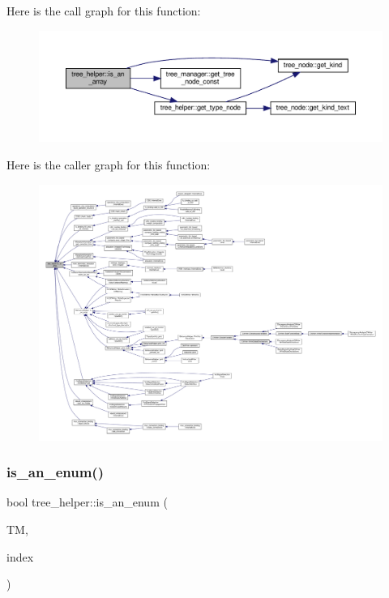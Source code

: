 Here is the call graph for this function\+:
\nopagebreak
\begin{figure}[H]
\begin{center}
\leavevmode
\includegraphics[width=350pt]{d7/d99/classtree__helper_a66c316e257537a7af62192751c0fb26a_cgraph}
\end{center}
\end{figure}
Here is the caller graph for this function\+:
\nopagebreak
\begin{figure}[H]
\begin{center}
\leavevmode
\includegraphics[width=350pt]{d7/d99/classtree__helper_a66c316e257537a7af62192751c0fb26a_icgraph}
\end{center}
\end{figure}
\mbox{\label{classtree__helper_ad18a626687479193e34f341bf2cc131e}} 
\subsubsection{\texorpdfstring{is\+\_\+an\+\_\+enum()}{is\_an\_enum()}}
{\footnotesize\ttfamily bool tree\+\_\+helper\+::is\+\_\+an\+\_\+enum (\begin{DoxyParamCaption}\item[{const \hyperlink{tree__manager_8hpp_a792e3f1f892d7d997a8d8a4a12e39346}{tree\+\_\+manager\+Const\+Ref} \&}]{TM,  }\item[{const unsigned int}]{index }\end{DoxyParamCaption})\hspace{0.3cm}{\ttfamily [static]}}



